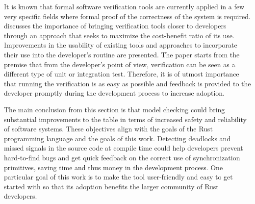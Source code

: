 \documentclass[../Thesis.tex]{subfiles}
\begin{document}
It is known that formal software verification tools are currently applied
in a few very specific fields where
formal proof of the correctness of the system is required.
\cite{reid:hatra:2020} discusses the importance of bringing verification
tools closer to developers through an approach
that seeks to maximize the cost-benefit ratio of its use.
Improvements in the usability of existing tools and
approaches to incorporate their use into the developer's routine are presented.
The paper starts from the premise that from the developer's point of view,
verification can be seen as a different type of unit or integration test.
Therefore, it is of utmost importance that running the verification is as easy as possible
and feedback is provided to the developer promptly during the development process
to increase adoption.

The main conclusion from this section is
that model checking could bring substantial improvements
to the table in terms of increased safety and reliability of software systems.
These objectives align with the goals of
the Rust programming language and the goals of this work.
Detecting deadlocks and missed signals in the source code at compile time could
help developers prevent hard-to-find bugs and get quick feedback on the correct use
of synchronization primitives, saving time and thus money in the development process.
One particular goal of this work is
to make the tool user-friendly and easy to get started with
so that its adoption benefits the larger community of Rust developers.
\end{document}

